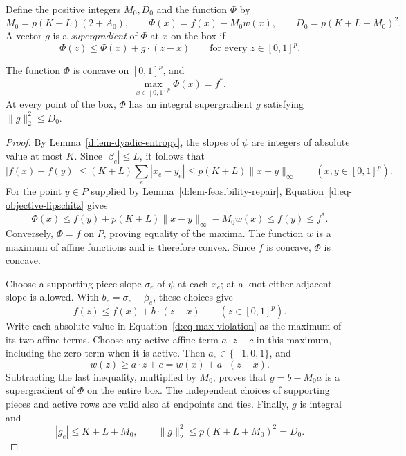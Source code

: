 Define the positive integers \(M_0,D_0\) and the function \(\Phi\) by
\begin{equation}
\label{d:eq-penalty-parameters}
M_0=p(K+L)(2+A_0),\qquad
\Phi(x)=f(x)-M_0w(x),\qquad
D_0=p(K+L+M_0)^2.
\end{equation}
A vector \(g\) is a \emph{supergradient} of \(\Phi\) at \(x\) on the box if
\[
\Phi(z)\le \Phi(x)+g\cdot(z-x)
\qquad\text{for every }z\in[0,1]^p.
\]

\begin{lemma}
\label{d:lem-exact-penalty}
The function \(\Phi\) is concave on \([0,1]^p\), and
\[
\max_{x\in[0,1]^p}\Phi(x)=f^*.
\]
At every point of the box, \(\Phi\) has an integral supergradient \(g\)
satisfying \(\|g\|_2^2\le D_0\).
\end{lemma}

\begin{proof}
By Lemma~\ref{d:lem-dyadic-entropy}, the slopes of \(\psi\) are integers of
absolute value at most \(K\).  Since \(|\beta_e|\le L\), it follows that
\begin{equation}
\label{d:eq-objective-lipschitz}
|f(x)-f(y)|\le (K+L)\sum_e|x_e-y_e|
            \le p(K+L)\|x-y\|_\infty
\qquad (x,y\in[0,1]^p).
\end{equation}
For the point \(y\in P\) supplied by Lemma~\ref{d:lem-feasibility-repair},
Equation~\eqref{d:eq-objective-lipschitz} gives
\[
\Phi(x)
\le f(y)+p(K+L)\|x-y\|_\infty-M_0w(x)
\le f(y)\le f^*.
\]
Conversely, \(\Phi=f\) on \(P\), proving equality of the maxima.
The function \(w\) is a maximum of affine functions and is therefore
convex.  Since \(f\) is concave, \(\Phi\) is concave.

Choose a supporting piece slope \(\sigma_e\) of \(\psi\) at each \(x_e\);
at a knot either adjacent slope is allowed.  With
\(b_e=\sigma_e+\beta_e\), these choices give
\[
f(z)\le f(x)+b\cdot(z-x)
\qquad (z\in[0,1]^p).
\]
Write each absolute value in Equation~\eqref{d:eq-max-violation} as the
maximum of its two affine terms.  Choose any active affine term
\(a\cdot z+c\) in this maximum, including the zero term when it is active.
Then \(a_e\in\{-1,0,1\}\), and
\[
w(z)\ge a\cdot z+c=w(x)+a\cdot(z-x).
\]
Subtracting the last inequality, multiplied by \(M_0\), proves that
\(g=b-M_0a\) is a supergradient of \(\Phi\) on the entire box.
The independent choices of supporting pieces and active rows are valid
also at endpoints and ties.  Finally, \(g\) is integral and
\[
|g_e|\le K+L+M_0,
\qquad
\|g\|_2^2\le p(K+L+M_0)^2=D_0.
\]
\end{proof}

